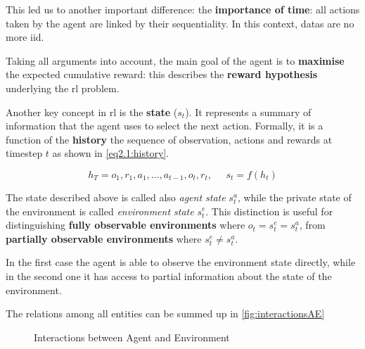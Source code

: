 This led us to another important difference: the \textbf{importance of time}: all actions taken by the agent are linked by their sequentiality. In this context, datas are no more \gls{iid}.

Taking all arguments into account, the main goal of the agent is to \textbf{maximise} the expected cumulative reward: this describes the \textbf{reward hypothesis} underlying the \gls{rl} problem. 


Another key concept in \gls{rl} is the \textbf{state} ($s_t$). It represents a summary of information that the agent uses to select the next action. Formally, it is a function of the \textbf{history} the sequence of observation, actions and rewards at timestep $t$ as shown in \vref{eq2.1:history}.

\begin{equation}\label{eq2.1:history}
h_T = o_1, r_1, a_1, \dots, a_{t-1}, o_{t}, r_t, \;\;\;\;\; s_t = f(h_t)
\end{equation}

The state described above is called also \textit{agent state} $s_t^a$, while the private state of the environment is called \textit{environment state} $s_t^e$. This distinction is useful for distinguishing \textbf{fully observable environments} where $o_t = s_t^e = s_t^a$, from \textbf{partially observable environments} where $s_t^e \neq s_t^a$.

In the first case the agent is able to observe the environment state directly, while in the second one it has access to partial information about the state of the environment.






The relations among all entities can be summed up in \vref{fig:interactionsAE}

\begin{figure}
	\centering
	\caption[Interactions between Agent and Environment]{Interactions between Agent and Environment}
	\label{fig:interactionsAE}
\end{figure}




